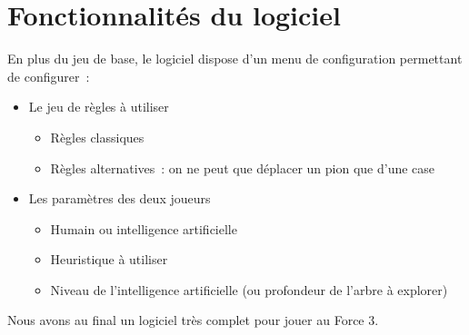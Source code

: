 \chapter{Fonctionnalités du logiciel}

En plus du jeu de base, le logiciel dispose d'un menu de configuration
permettant de configurer :
\begin{itemize}
    \item Le jeu de règles à utiliser
        \begin{itemize}
            \item Règles classiques
            \item Règles alternatives : on ne peut que déplacer un pion que d'une case
        \end{itemize}
    \item Les paramètres des deux joueurs
        \begin{itemize}
            \item Humain ou intelligence artificielle
            \item Heuristique à utiliser
            \item Niveau de l'intelligence artificielle (ou profondeur de
                l'arbre à explorer)
        \end{itemize}
\end{itemize}

Nous avons au final un logiciel très complet pour jouer au Force 3.

